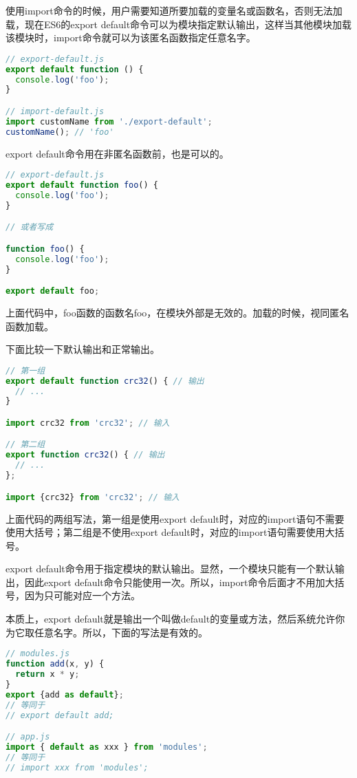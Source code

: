 使用import命令的时候，用户需要知道所要加载的变量名或函数名，否则无法加载，现在ES6的export default命令可以为模块指定默认输出，这样当其他模块加载该模块时，import命令就可以为该匿名函数指定任意名字。



\begin{lstlisting}[language=JavaScript]
// export-default.js
export default function () {
  console.log('foo');
}

// import-default.js
import customName from './export-default';
customName(); // 'foo'
\end{lstlisting}


export default命令用在非匿名函数前，也是可以的。

\begin{lstlisting}[language=JavaScript]
// export-default.js
export default function foo() {
  console.log('foo');
}

// 或者写成

function foo() {
  console.log('foo');
}

export default foo;
\end{lstlisting}

上面代码中，foo函数的函数名foo，在模块外部是无效的。加载的时候，视同匿名函数加载。


下面比较一下默认输出和正常输出。

\begin{lstlisting}[language=JavaScript]
// 第一组
export default function crc32() { // 输出
  // ...
}

import crc32 from 'crc32'; // 输入

// 第二组
export function crc32() { // 输出
  // ...
};

import {crc32} from 'crc32'; // 输入
\end{lstlisting}

上面代码的两组写法，第一组是使用export default时，对应的import语句不需要使用大括号；第二组是不使用export default时，对应的import语句需要使用大括号。

export default命令用于指定模块的默认输出。显然，一个模块只能有一个默认输出，因此export default命令只能使用一次。所以，import命令后面才不用加大括号，因为只可能对应一个方法。

本质上，export default就是输出一个叫做default的变量或方法，然后系统允许你为它取任意名字。所以，下面的写法是有效的。

\begin{lstlisting}[language=JavaScript]
// modules.js
function add(x, y) {
  return x * y;
}
export {add as default};
// 等同于
// export default add;

// app.js
import { default as xxx } from 'modules';
// 等同于
// import xxx from 'modules';
\end{lstlisting}


